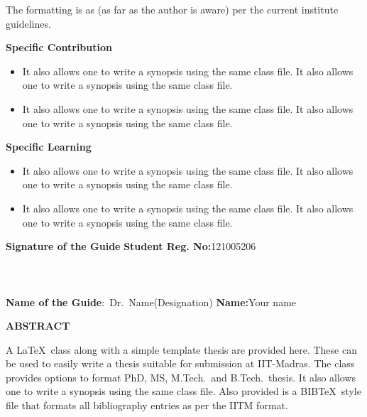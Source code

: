 \documentclass[a4paper, 12pt, oneside]{sastra}
\begin{document}
	The formatting is as (as far as the author is aware) per the current institute guidelines.
	
	\noindent \textbf{Specific Contribution}
	\begin{itemize}
		\item It also allows one to write a synopsis using the same class file. It also allows one to write a synopsis using the same class file.
		\item It also allows one to write a synopsis using the same class file. It also allows one to write a synopsis using the same class file.
	\end{itemize}
	\noindent \textbf{Specific Learning}
	\begin{itemize}
		\item It also allows one to write a synopsis using the same class file. It also allows one to write a synopsis using the same class file.
		\item It also allows one to write a synopsis using the same class file. It also allows one to write a synopsis using the same class file.
	\end{itemize}
	
	\vspace*{24pt}
	
\noindent \textbf{Signature of the Guide} \hspace*{70mm} \textbf{Student Reg. No:}121005206\\
	\\
\\
\\
\noindent \textbf{Name of the Guide}:~Dr.~Name(Designation) \hspace*{35mm} \textbf{Name:}Your name
\pagebreak
	
	\begin{center}
		\Large{{\textbf{ABSTRACT}}}
	\end{center}
	
	
	\vspace*{24pt}
	
	\noindent A \LaTeX\ class along with a simple template thesis are provided here.  These can be used to easily write a thesis suitable for submission at IIT-Madras.  The class provides options to format PhD, MS, M.Tech.\ and B.Tech.\ thesis.  It also allows one to write a synopsis using the same class file.  Also provided is a BIB\TeX\ style file that formats all bibliography entries as per the IITM format.
	
\end{document}
